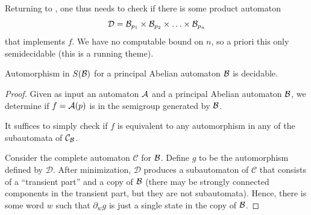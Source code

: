 \documentclass[11pt, titlepage]{article}
\begin{document}
Returning to , one thus needs to check if there is
some product automaton
\[
  \mathcal{D} = \mathcal{B}_{p_1} \times \mathcal{B}_{p_2} \times \ldots \times \mathcal{B}_{p_n}
\]
that implements $f$. We have no computable bound on $n$, so a priori
this only semidecidable (this is a running theme).

\begin{theorem}
  Automorphism  in $S(\mathcal{B})$ for a principal Abelian
  automaton $\mathcal{B}$ is decidable.
\end{theorem}
\begin{proof}
  Given as input an automaton $\mathcal{A}$ and a principal Abelian automaton
  $\mathcal{B}$, we determine if $f = \mathcal{A}(p)$ is in the semigroup generated by
  $\mathcal{B}$.

  It suffices to simply check if $f$ is equivalent to any automorphism
  in any of the subautomata of $\mathcal{C}_{\mathcal{B}}$.

  Consider the complete automaton $\mathcal{C}$ for $\mathcal{B}$. Define $g$
  to be the automorphism defined by $\mathcal{D}$. After minimization,
  $\mathcal{D}$ produces a subautomaton of $\mathcal{C}$ that consists
  of a ``transient part'' and a copy of $\mathcal{B}$ (there may be strongly
  connected components in the transient part, but they are not
  subautomata). Hence, there is some word $w$ such that $\partial_w g$
  is just a single state in the copy of $\mathcal{B}$.



\end{proof}

{\color{TODO}


%
}
\end{document}
